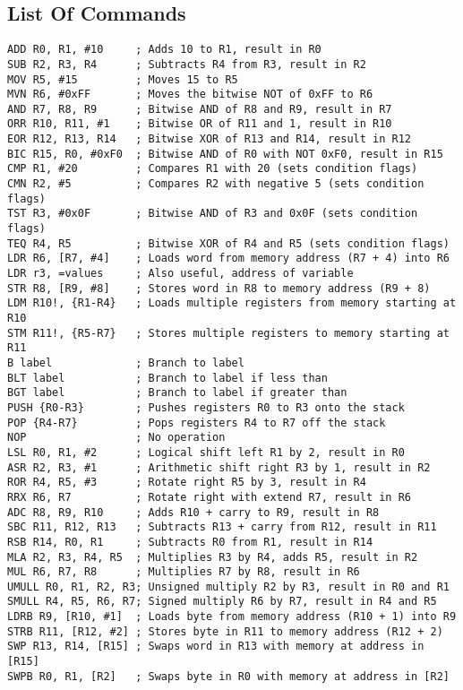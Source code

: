 \documentclass[11pt]{article}
\begin{document}
\subsection{List Of Commands}
\label{sec:orgc184c8c}
\begin{verbatim}
ADD R0, R1, #10     ; Adds 10 to R1, result in R0
SUB R2, R3, R4      ; Subtracts R4 from R3, result in R2
MOV R5, #15         ; Moves 15 to R5
MVN R6, #0xFF       ; Moves the bitwise NOT of 0xFF to R6
AND R7, R8, R9      ; Bitwise AND of R8 and R9, result in R7
ORR R10, R11, #1    ; Bitwise OR of R11 and 1, result in R10
EOR R12, R13, R14   ; Bitwise XOR of R13 and R14, result in R12
BIC R15, R0, #0xF0  ; Bitwise AND of R0 with NOT 0xF0, result in R15
CMP R1, #20         ; Compares R1 with 20 (sets condition flags)
CMN R2, #5          ; Compares R2 with negative 5 (sets condition flags)
TST R3, #0x0F       ; Bitwise AND of R3 and 0x0F (sets condition flags)
TEQ R4, R5          ; Bitwise XOR of R4 and R5 (sets condition flags)
LDR R6, [R7, #4]    ; Loads word from memory address (R7 + 4) into R6
LDR r3, =values     ; Also useful, address of variable
STR R8, [R9, #8]    ; Stores word in R8 to memory address (R9 + 8)
LDM R10!, {R1-R4}   ; Loads multiple registers from memory starting at R10
STM R11!, {R5-R7}   ; Stores multiple registers to memory starting at R11
B label             ; Branch to label
BLT label           ; Branch to label if less than
BGT label           ; Branch to label if greater than
PUSH {R0-R3}        ; Pushes registers R0 to R3 onto the stack
POP {R4-R7}         ; Pops registers R4 to R7 off the stack
NOP                 ; No operation
LSL R0, R1, #2      ; Logical shift left R1 by 2, result in R0
ASR R2, R3, #1      ; Arithmetic shift right R3 by 1, result in R2
ROR R4, R5, #3      ; Rotate right R5 by 3, result in R4
RRX R6, R7          ; Rotate right with extend R7, result in R6
ADC R8, R9, R10     ; Adds R10 + carry to R9, result in R8
SBC R11, R12, R13   ; Subtracts R13 + carry from R12, result in R11
RSB R14, R0, R1     ; Subtracts R0 from R1, result in R14
MLA R2, R3, R4, R5  ; Multiplies R3 by R4, adds R5, result in R2
MUL R6, R7, R8      ; Multiplies R7 by R8, result in R6
UMULL R0, R1, R2, R3; Unsigned multiply R2 by R3, result in R0 and R1
SMULL R4, R5, R6, R7; Signed multiply R6 by R7, result in R4 and R5
LDRB R9, [R10, #1]  ; Loads byte from memory address (R10 + 1) into R9
STRB R11, [R12, #2] ; Stores byte in R11 to memory address (R12 + 2)
SWP R13, R14, [R15] ; Swaps word in R13 with memory at address in [R15]
SWPB R0, R1, [R2]   ; Swaps byte in R0 with memory at address in [R2]

\end{verbatim}
\end{document}
